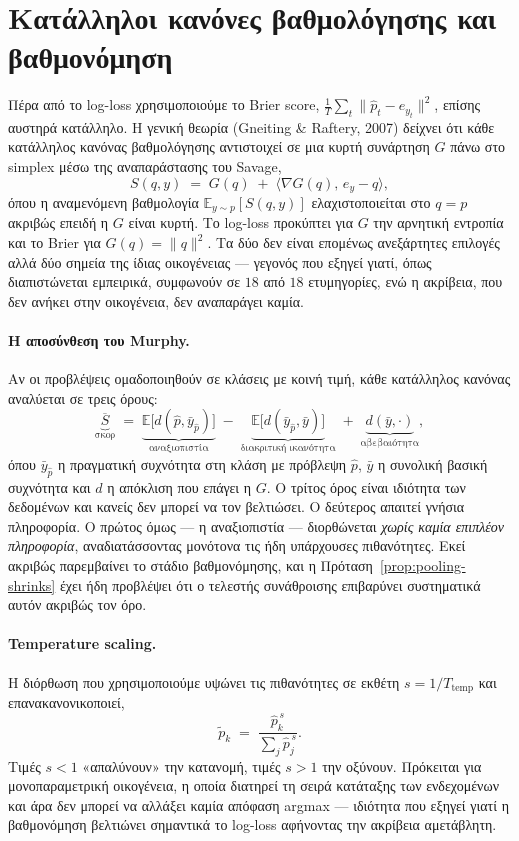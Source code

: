 \documentclass[12pt,a4paper,oneside]{report}
\newcommand{\en}[1]{\textenglish{#1}}
\renewcommand{\_}{\oldunderscore\allowbreak}
\theoremstyle{definition}
\theoremstyle{plain}
\theoremstyle{remark}
\begin{document}
\section{Κατάλληλοι κανόνες βαθμολόγησης και βαθμονόμηση}
\label{sec:calib-theory}

Πέρα από το log-loss χρησιμοποιούμε το Brier score, $\frac{1}{T}\sum_t \|\hat{p}_t -
e_{y_t}\|^2$, επίσης αυστηρά κατάλληλο. Η γενική θεωρία (Gneiting \& Raftery, 2007) δείχνει
ότι κάθε κατάλληλος κανόνας βαθμολόγησης αντιστοιχεί σε μια κυρτή συνάρτηση $G$ πάνω στο
simplex μέσω της αναπαράστασης του Savage,
\[
S(q,y) \;=\; G(q) \;+\; \langle \nabla G(q),\, e_y - q\rangle,
\]
όπου η αναμενόμενη βαθμολογία $\mathbb{E}_{y\sim p}[S(q,y)]$ ελαχιστοποιείται στο $q=p$
ακριβώς επειδή η $G$ είναι κυρτή. Το log-loss προκύπτει για $G$ την αρνητική εντροπία και το
Brier για $G(q)=\|q\|^2$. Τα δύο δεν είναι επομένως ανεξάρτητες επιλογές αλλά δύο σημεία της
ίδιας οικογένειας --- γεγονός που εξηγεί γιατί, όπως διαπιστώνεται εμπειρικά, συμφωνούν σε
$18$ από $18$ ετυμηγορίες, ενώ η ακρίβεια, που δεν ανήκει στην οικογένεια, δεν αναπαράγει
καμία.

\paragraph{Η αποσύνθεση του Murphy.} Αν οι προβλέψεις ομαδοποιηθούν σε κλάσεις με κοινή
τιμή, κάθε κατάλληλος κανόνας αναλύεται σε τρεις όρους:
\[
\underbrace{\overline{S}}_{\text{σκορ}} \;=\;
\underbrace{\mathbb{E}\big[ d(\hat{p}, \bar{y}_{\hat{p}}) \big]}_{\text{αναξιοπιστία}}
\;-\; \underbrace{\mathbb{E}\big[ d(\bar{y}_{\hat{p}}, \bar{y}) \big]}_{\text{διακριτική ικανότητα}}
\;+\; \underbrace{d(\bar{y}, \cdot)}_{\text{αβεβαιότητα}},
\]
όπου $\bar{y}_{\hat{p}}$ η πραγματική συχνότητα στη κλάση με πρόβλεψη $\hat{p}$, $\bar{y}$ η
συνολική βασική συχνότητα και $d$ η απόκλιση που επάγει η $G$. Ο τρίτος όρος είναι ιδιότητα
των δεδομένων και κανείς δεν μπορεί να τον βελτιώσει. Ο δεύτερος απαιτεί γνήσια πληροφορία.
Ο πρώτος όμως --- η αναξιοπιστία --- διορθώνεται \emph{χωρίς καμία επιπλέον πληροφορία},
αναδιατάσσοντας μονότονα τις ήδη υπάρχουσες πιθανότητες. Εκεί ακριβώς παρεμβαίνει το στάδιο
βαθμονόμησης, και η Πρόταση~\ref{prop:pooling-shrinks} έχει ήδη προβλέψει ότι ο τελεστής
συνάθροισης επιβαρύνει συστηματικά αυτόν ακριβώς τον όρο.

\paragraph{Temperature scaling.} Η διόρθωση που χρησιμοποιούμε υψώνει τις πιθανότητες σε
εκθέτη $s = 1/T_{\text{temp}}$ και επανακανονικοποιεί,
\[
\tilde{p}_k \;=\; \frac{\hat{p}_k^{\,s}}{\sum_{j} \hat{p}_j^{\,s}}.
\]
Τιμές $s<1$ «απαλύνουν» την κατανομή, τιμές $s>1$ την οξύνουν. Πρόκειται για μονοπαραμετρική
οικογένεια, η οποία διατηρεί τη σειρά κατάταξης των ενδεχομένων και άρα δεν μπορεί να
αλλάξει καμία απόφαση \en{argmax} --- ιδιότητα που εξηγεί γιατί η βαθμονόμηση βελτιώνει
σημαντικά το log-loss αφήνοντας την ακρίβεια αμετάβλητη.
\end{document}
